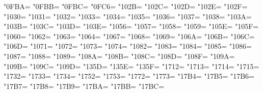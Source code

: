 \XeTeXcharclass"0FBA=\KclassCM
\XeTeXcharclass"0FBB=\KclassCM
\XeTeXcharclass"0FBC=\KclassCM
\XeTeXcharclass"0FC6=\KclassCM
\XeTeXcharclass"102B=\KclassCM
\XeTeXcharclass"102C=\KclassCM
\XeTeXcharclass"102D=\KclassCM
\XeTeXcharclass"102E=\KclassCM
\XeTeXcharclass"102F=\KclassCM
\XeTeXcharclass"1030=\KclassCM
\XeTeXcharclass"1031=\KclassCM
\XeTeXcharclass"1032=\KclassCM
\XeTeXcharclass"1033=\KclassCM
\XeTeXcharclass"1034=\KclassCM
\XeTeXcharclass"1035=\KclassCM
\XeTeXcharclass"1036=\KclassCM
\XeTeXcharclass"1037=\KclassCM
\XeTeXcharclass"1038=\KclassCM
\XeTeXcharclass"103A=\KclassCM
\XeTeXcharclass"103B=\KclassCM
\XeTeXcharclass"103C=\KclassCM
\XeTeXcharclass"103D=\KclassCM
\XeTeXcharclass"103E=\KclassCM
\XeTeXcharclass"1056=\KclassCM
\XeTeXcharclass"1057=\KclassCM
\XeTeXcharclass"1058=\KclassCM
\XeTeXcharclass"1059=\KclassCM
\XeTeXcharclass"105E=\KclassCM
\XeTeXcharclass"105F=\KclassCM
\XeTeXcharclass"1060=\KclassCM
\XeTeXcharclass"1062=\KclassCM
\XeTeXcharclass"1063=\KclassCM
\XeTeXcharclass"1064=\KclassCM
\XeTeXcharclass"1067=\KclassCM
\XeTeXcharclass"1068=\KclassCM
\XeTeXcharclass"1069=\KclassCM
\XeTeXcharclass"106A=\KclassCM
\XeTeXcharclass"106B=\KclassCM
\XeTeXcharclass"106C=\KclassCM
\XeTeXcharclass"106D=\KclassCM
\XeTeXcharclass"1071=\KclassCM
\XeTeXcharclass"1072=\KclassCM
\XeTeXcharclass"1073=\KclassCM
\XeTeXcharclass"1074=\KclassCM
\XeTeXcharclass"1082=\KclassCM
\XeTeXcharclass"1083=\KclassCM
\XeTeXcharclass"1084=\KclassCM
\XeTeXcharclass"1085=\KclassCM
\XeTeXcharclass"1086=\KclassCM
\XeTeXcharclass"1087=\KclassCM
\XeTeXcharclass"1088=\KclassCM
\XeTeXcharclass"1089=\KclassCM
\XeTeXcharclass"108A=\KclassCM
\XeTeXcharclass"108B=\KclassCM
\XeTeXcharclass"108C=\KclassCM
\XeTeXcharclass"108D=\KclassCM
\XeTeXcharclass"108F=\KclassCM
\XeTeXcharclass"109A=\KclassCM
\XeTeXcharclass"109B=\KclassCM
\XeTeXcharclass"109C=\KclassCM
\XeTeXcharclass"109D=\KclassCM
\XeTeXcharclass"135D=\KclassCM
\XeTeXcharclass"135E=\KclassCM
\XeTeXcharclass"135F=\KclassCM
\XeTeXcharclass"1712=\KclassCM
\XeTeXcharclass"1713=\KclassCM
\XeTeXcharclass"1714=\KclassCM
\XeTeXcharclass"1715=\KclassCM
\XeTeXcharclass"1732=\KclassCM
\XeTeXcharclass"1733=\KclassCM
\XeTeXcharclass"1734=\KclassCM
\XeTeXcharclass"1752=\KclassCM
\XeTeXcharclass"1753=\KclassCM
\XeTeXcharclass"1772=\KclassCM
\XeTeXcharclass"1773=\KclassCM
\XeTeXcharclass"17B4=\KclassCM
\XeTeXcharclass"17B5=\KclassCM
\XeTeXcharclass"17B6=\KclassCM
\XeTeXcharclass"17B7=\KclassCM
\XeTeXcharclass"17B8=\KclassCM
\XeTeXcharclass"17B9=\KclassCM
\XeTeXcharclass"17BA=\KclassCM
\XeTeXcharclass"17BB=\KclassCM
\XeTeXcharclass"17BC=\KclassCM
